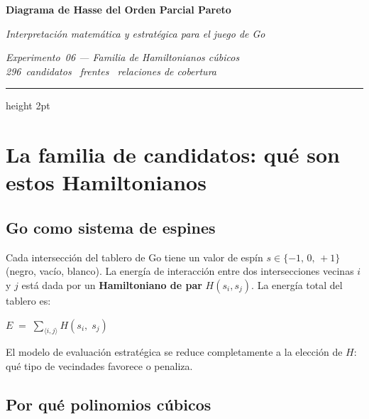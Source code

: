\documentclass[11pt, a4paper]{article}
\begin{document}
\thispagestyle{fancy}

\vspace*{4pt}
{\color{cNavy}\Huge\bfseries Diagrama de Hasse del Orden Parcial Pareto}

\vspace{6pt}
{\color{cMuted}\large\itshape
  Interpretaci\'on matem\'atica y estrat\'egica para el juego de Go}

\vspace{4pt}
{\color{cMuted}\small\itshape
  Experimento~06 --- Familia de Hamiltonianos c\'ubicos}\\[1pt]
{\color{cMuted}\small\itshape
  296~candidatos \enspace\textbullet{}~frentes \enspace\textbullet{}~relaciones de cobertura}

\vspace{8pt}
{\color{cAccent}\hrule height 2pt}
\vspace{10pt}

\section{La familia de candidatos: qu\'e son estos Hamiltonianos}

\subsection{Go como sistema de espines}

Cada intersecci\'on del tablero de Go tiene un valor de esp\'in
$s \in \{-1,\,0,\,+1\}$ (negro, vac\'io, blanco). La energ\'ia de
interacci\'on entre dos intersecciones vecinas $i$ y $j$ est\'a dada por un
\textbf{Hamiltoniano de par} $H(s_i,s_j)$. La energ\'ia total del tablero es:

\begin{tcolorbox}[codebox]
$\displaystyle E \;=\; \sum_{\langle i,j \rangle} H(s_i,\; s_j)$
\end{tcolorbox}

El modelo de evaluaci\'on estrat\'egica se reduce completamente a la elecci\'on
de $H$: qu\'e tipo de vecindades favorece o penaliza.

\subsection{Por qu\'e polinomios c\'ubicos}
\end{document}
